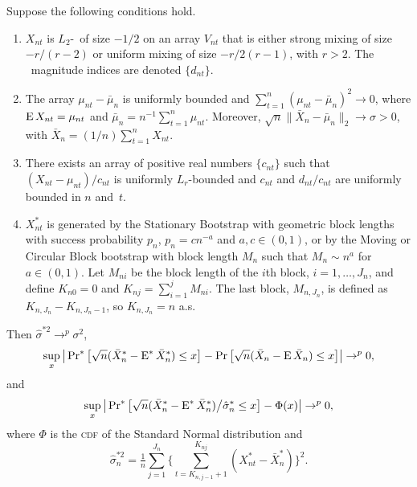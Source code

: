 \documentclass[11pt]{article}
\begin{document}
\begin{thm}\label{main-bootstrap-clt}
  Suppose the following conditions hold.
  \begin{enumerate}
  \item $X_{nt}$ is $L_2$-\ned\ of size $-1/2$ on an array
    $V_{nt}$ that is either strong mixing of size $-r/(r-2)$ or
    uniform mixing of size $-r/2(r-1)$, with $r > 2$.  The
    \ned\ magnitude indices are denoted $\{d_{nt}\}$.
  \item The array $\mu_{nt} - \bar \mu_n$ is uniformly bounded
    and $\sum_{t=1}^n (\mu_{nt} - \bar \mu_n)^2 \to 0$,
    where $\operatorname{E} X_{nt} = \mu_{nt}$ and $\bar{\mu}_n = n^{-1} \sum_{t=1}^n
    \mu_{nt}$. Moreover, $\sqrt{n} \| \bar{X}_{n} - \bar\mu_n \|_2
    \to \sigma > 0$, with $\bar X_n = (1/n) \sum_{t=1}^n X_{nt}$.
  \item There exists an array of positive real numbers $\{c_{nt}\}$
    such that $(X_{nt} - \mu_{nt})/c_{nt}$ is uniformly $L_r$-bounded
    and $c_{nt}$ and $d_{nt}/c_{nt}$ are uniformly bounded in $n$
    and~$t$.
  \item $X_{nt}^{*}$ is generated by the Stationary Bootstrap with
    geometric block lengths with success probability $p_n$, $p_n = c
    n^{-a}$ and $a,c \in (0,1)$, or by the Moving or Circular Block
    bootstrap with block length $M_n$ such that $M_n \sim n^a$ for
    $a \in (0,1)$.  Let $M_{ni}$ be the block length of the $i$th
    block, $i=1,\dots,J_n$, and define $K_{n0} = 0$ and $K_{nj} =
    \sum_{i=1}^j M_{ni}$. The last block, $M_{n,J_n}$, is defined as
    $K_{n,J_n} - K_{n,J_n-1}$, so $K_{n,J_n} = n$ a.s.
  \end{enumerate}
  Then $\hat\sigma^{*2} \to^p \sigma^2$,
  \begin{equation}\label{eq:36}
    \sup_x \big\lvert \operatorname{Pr}^{*}\big[\sqrt{n}(\bar X_{n}^{*} - \operatorname{E}^* \bar X_n^*) \leq x \big]
    - \operatorname{Pr} \big[\sqrt{n}(\bar X_{n} - \operatorname{E} \bar X_n) \leq x \big] \big\rvert \to^p 0,
  \end{equation}
  and
  \begin{equation}
    \label{eq:2}
    \sup_x \big\lvert \operatorname{Pr}^{*}\big[
    \sqrt{n}(\bar X_{n}^{*} -  \operatorname{E}^* \bar X_n^*) \big/ \hat\sigma_n^{*}
    \leq x \big] - \Phi(x) \big\rvert \to^p 0,
  \end{equation}
  where $\Phi$ is the \textsc{cdf} of the Standard Normal
  distribution and
    \begin{equation}
      \label{eq:3}
      \hat{\sigma}_n^{*2} = \tfrac{1}{n} \sum_{j=1}^{J_n}
      \Big\{\sum_{t=K_{n,j-1}+1}^{K_{nj}} (X_{nt}^{*} - \bar X_{n}^{*})\Big\}^2.
    \end{equation}
\end{thm}
\end{document}
